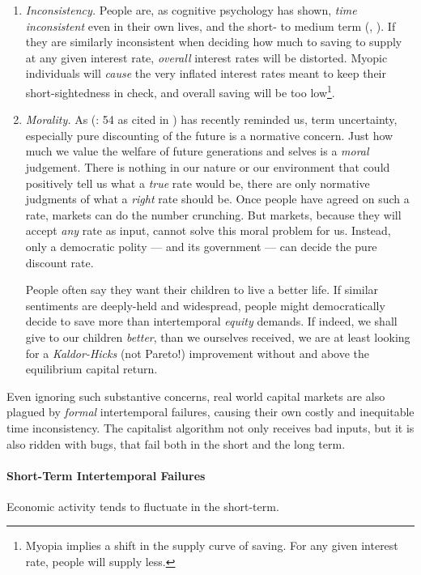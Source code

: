 \begin{enumerate}
	\item \emph{Inconsistency.} People are, as cognitive psychology has shown, \emph{time inconsistent} even in their own lives, and the short- to medium term (\citealt{Ainslie1975}, \citealt{Thaler1981}). If they are similarly inconsistent  when deciding how much to saving to supply at any given interest rate, \emph{overall} interest rates will be distorted. Myopic individuals will \emph{cause} the very inflated interest rates meant to keep their short-sightedness in check, and overall saving will be too low\footnote{
		Myopia implies a shift in the supply curve of saving. For any given interest rate, people will supply less.}.
	\item \emph{Morality.} As \citeauthor{Samuelson2005} (\citeyear{Samuelson2005}: 54 as cited in \citealt{Stern-2006-aa}) has recently reminded us, term uncertainty, especially pure discounting of the future is a normative concern. Just how much we value the welfare of future generations and selves is a \emph{moral} judgement. There is nothing in our nature or our environment that could positively tell us what a \emph{true} rate would be, there are only normative judgments of what a \emph{right} rate should be. Once people have agreed on such a rate, markets can do the number crunching. But markets, because they will accept \emph{any} rate as input, cannot solve this moral problem for us. Instead, only a democratic polity --- and its government --- can decide the pure discount rate.
		
	People often say they want their children to live a better life. If similar sentiments are deeply-held and widespread, people might democratically decide to save more than intertemporal \emph{equity} demands. If indeed, we shall give to our children \emph{better}, than we ourselves received, we are at least looking for a \emph{Kaldor-Hicks} (not Pareto!) improvement without and above the equilibrium capital return.
	
\end{enumerate}

Even ignoring such substantive concerns, real world capital markets are also plagued by \emph{formal} intertemporal failures, causing their own costly and inequitable time inconsistency. The capitalist algorithm not only receives bad inputs, but it is also ridden with bugs, that fail both in the short and the long term.

\paragraph{Short-Term Intertemporal Failures} \label{sec:short-term_inconsistency} Economic activity tends to fluctuate in the short-term. 

